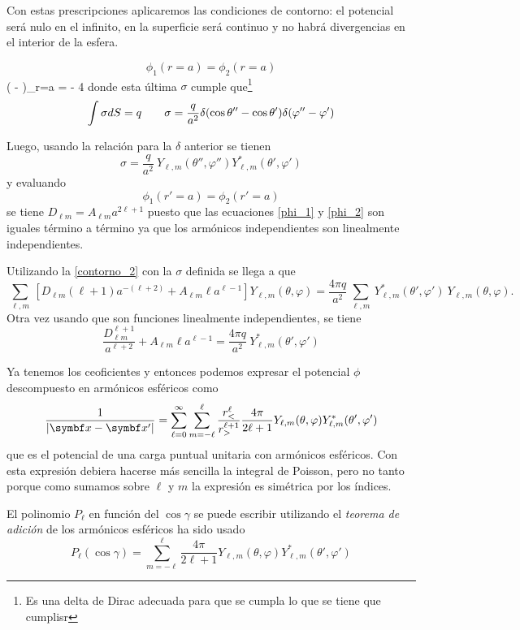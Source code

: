 \documentclass[10pt,oneside]{CBFT_book}
\begin{document}
Con estas prescripciones aplicaremos las condiciones de contorno: el potencial será nulo en el infinito,
en la superficie será continuo y no habrá divergencias en el interior de la esfera.

\[
	\phi_1(r=a) = \phi_2(r=a)
\]
\be
	\left(  -  \right)_{r=a} = - 4 \pi \sigma
	\label{contorno_2}
\ee
donde esta última $\sigma$ cumple que\footnote{Es una delta de Dirac adecuada para que se cumpla lo que
se tiene que cumplisr}
\[
	\int \sigma dS = q \qquad \sigma = \frac{q}{a^2} \delta(\cos\theta'' - \cos\theta') \delta(\varphi''-\varphi')
\]

Luego, usando la relación para la $\delta $ anterior se tienen
\[
	\sigma = \frac{q}{a^2} \: Y_{\ell,m}(\theta'',\varphi'') Y_{\ell,m}^*(\theta',\varphi')
\]
y evaluando 
\[
	\phi_1(r'=a) = \phi_2(r'=a)
\]
se tiene $D_{\ell m} = A_{\ell m} a^{2\ell +1}$ puesto que las ecuaciones \eqref{phi_1} y \eqref{phi_2}
son iguales término a término ya que los armónicos independientes son linealmente independientes.

Utilizando la \eqref{contorno_2} con la $\sigma$ definida se llega a que
\[
	\: \sum_{\ell,m} \: 
	\left[ D_{\ell m}(\ell +1) a^{-(\ell + 2)} + A_{\ell m} \ell a^{\ell - 1 } \right] 
	Y_{\ell,m}(\theta,\varphi) =
	\frac{4 \pi q}{a^2} \: \sum_{\ell,m} \: Y_{\ell,m}^*(\theta',\varphi') \: Y_{\ell,m}(\theta,\varphi).
\]
Otra vez usando que son funciones linealmente independientes, se tiene
\[
	\frac{D_{\ell m}^{\ell +1}}{a^{\ell + 2}} + A_{\ell m} \ell a^{\ell - 1 } = 
	\frac{4 \pi q}{a^2} \: Y_{\ell,m}^*(\theta',\varphi')
\]

Ya tenemos los ceoficientes y entonces podemos expresar
el potencial $\phi$ descompuesto en armónicos esféricos como
\[
	\frac{1}{|\vb{x}-\vb{x}'|}  = \sum_{\ell=0}^\infty \sum_{m=-\ell}^\ell \frac{r_<^\ell}{r_>^{\ell+1}}
	\frac{4\pi}{2\ell+1} Y_{\ell,m}(\theta,\varphi) Y_{\ell,m}^*(\theta',\varphi')
\]
que es el potencial de una carga puntual unitaria con armónicos esféricos.
Con esta expresión debiera hacerse más sencilla la integral de Poisson, pero no
tanto porque como sumamos sobre $\ell$ y $m$ la expresión es simétrica por los
índices.

El polinomio $P_\ell$ en función del $\cos\gamma$ se puede escribir utilizando
el {\it teorema de adición} de los armónicos esféricos ha sido usado
\[
	P_\ell(\cos \gamma) = \sum_{m=-\ell}^\ell \frac{4\pi}{2\ell+1} Y_{\ell,m}(\theta,\varphi) 
	Y_{\ell,m}^*(\theta',\varphi')
\]
\end{document}
